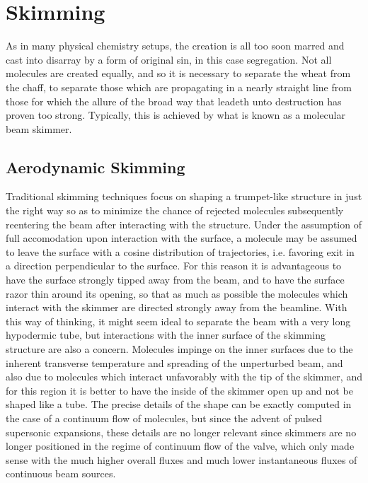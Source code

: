 \ifx\justbeingincluded\undefined

\fi



\chapter{Skimming}

As in many physical chemistry setups, the creation is all too soon marred and cast into disarray by a form of original sin, in this case segregation. Not all molecules are created equally, and so it is necessary to separate the wheat from the chaff, to separate those which are propagating in a nearly straight line from those for which the allure of the broad way that leadeth unto destruction has proven too strong. Typically, this is achieved by what is known as a molecular beam skimmer.

\section{Aerodynamic Skimming}

Traditional skimming techniques focus on shaping a trumpet-like structure in just the right way so as to minimize the chance of rejected molecules subsequently reentering the beam after interacting with the structure.
Under the assumption of full accomodation upon interaction with the surface, a molecule may be assumed to leave the surface with a cosine distribution of trajectories, i.e. favoring exit in a direction perpendicular to the surface.
For this reason it is advantageous to have the surface strongly tipped away from the beam, and to have the surface razor thin around its opening, so that as much as possible the molecules which interact with the skimmer are directed strongly away from the beamline.
With this way of thinking, it might seem ideal to separate the beam with a very long hypodermic tube, but interactions with the inner surface of the skimming structure are also a concern.
Molecules impinge on the inner surfaces due to the inherent transverse temperature and spreading of the unperturbed beam, and also due to molecules which interact unfavorably with the tip of the skimmer, and for this region it is better to have the inside of the skimmer open up and not be shaped like a tube.
The precise details of the shape can be exactly computed in the case of a continuum flow of molecules, but since the advent of pulsed supersonic expansions, these details are no longer relevant since skimmers are no longer positioned in the regime of continuum flow of the valve, which only made sense with the much higher overall fluxes and much lower instantaneous fluxes of continuous beam sources.

